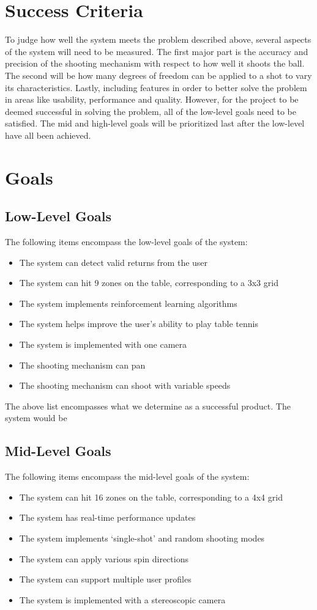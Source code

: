 \documentclass[11pt]{article}
\begin{document}
\section{Success Criteria}
To judge how well the system meets the problem described above, several aspects of the system will need to be measured. The first major part is the accuracy and precision of the shooting mechanism with respect to how well it shoots the ball. The second will be how many degrees of freedom can be applied to a shot to vary its characteristics. Lastly, including features in order to better solve the problem in areas like usability, performance and quality. However, for the project to be deemed successful in solving the problem, all of the low-level goals need to be satisfied. The mid and high-level goals will be prioritized last after the low-level have all been achieved.
\section{Goals}
\subsection{Low-Level Goals}
The following items encompass the low-level goals of the system:
\begin{itemize}
\item The system can detect valid returns from the user
\item The system can hit 9 zones on the table, corresponding to a 3x3 grid
\item The system implements reinforcement learning algorithms
\item The system helps improve the user's ability to play table tennis %
\item The system is implemented with one camera
\item The shooting mechanism can pan
\item The shooting mechanism can shoot with variable speeds
\end{itemize}
The above list encompasses what we determine as a successful product. The system would be 
\subsection{Mid-Level Goals}
The following items encompass the mid-level goals of the system:
\begin{itemize}
\item The system can hit 16 zones on the table, corresponding to a 4x4 grid
\item The system has real-time performance updates
\item The system implements `single-shot' and random shooting modes
\item The system can apply various spin directions
\item The system can support multiple user profiles
\item The system is implemented with a stereoscopic camera
\end{itemize}
\end{document}
